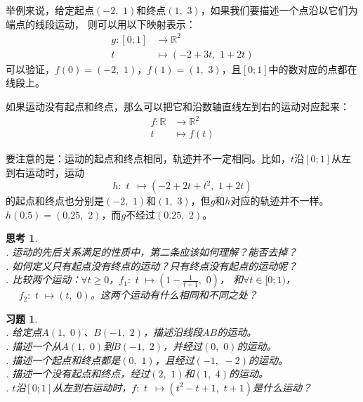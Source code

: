 \documentclass[12pt,UTF8]{ctexbook}
\theoremstyle{definition}
\theoremstyle{plain}
\newtheorem{sk}{思考}[section]
\newtheorem{xt}{习题}[section]
\begin{document}
举例来说，给定起点$(-2,\,\,1)$和终点$(1,\,\,3)$，如果我们要描述一个点沿以它们为端点的线段运动，
则可以用以下映射表示：
\begin{align*}
    g: [0;1] &\rightarrow \mathbb{R}^2  \\
         t \,\,\, &\mapsto (-2 + 3t,\,\, 1 + 2t) 
\end{align*}
可以验证，$f(0) = (-2,\,\,1)$，$f(1) = (1,\,\,3)$，且$[0;1]$中的数对应的点都在线段上。

如果运动没有起点和终点，那么可以把它和沿数轴直线左到右的运动对应起来：
\begin{align*}
    f: \mathbb{R} &\rightarrow \mathbb{R}^2  \\
         t \, &\mapsto f(t) 
\end{align*}

要注意的是：运动的起点和终点相同，轨迹并不一定相同。比如，$t$沿$[0;1]$从左到右运动时，运动
$$ h: \,\, t \,\,\, \mapsto (-2 + 2t + t^2,\,\, 1 + 2t) $$
的起点和终点也分别是$(-2,\,\,1)$和$(1,\,\,3)$，但$g$和$h$对应的轨迹并不一样。
$h(0.5) = (0.25, \,\,2)$，而$g$不经过$(0.25, \,\,2)$。

\begin{sk}
    \mbox{} \\
    . 运动的先后关系满足的性质中，第二条应该如何理解？能否去掉？\\
    . 如何定义只有起点没有终点的运动？只有终点没有起点的运动呢？\\
    . 比较两个运动：$\forall t \geqslant 0$，$f_1:\,\, t \,\, \mapsto (1 - \frac{1}{t+1}, \,\, 0)$，
    和$\forall t \in [0; 1)$，\\
    \indent $\quad \,\, f_2:\,\, t \,\, \mapsto (t, \,\,0)$。这两个运动有什么相同和不同之处？
\end{sk}

\begin{xt}
    \mbox{} \\
    . 给定点$A(1,\,\,0)$、$B(-1,\,\,2)$，描述沿线段$AB$的运动。\\
    . 描述一个从$A(1,\,\,0)$到$B(-1,\,\,2)$，并经过$(0,\,\,0)$的运动。\\
    . 描述一个起点和终点都是$(0, \,\, 1)$，且经过$(-1,\,\, -2)$的运动。\\
    . 描述一个没有起点和终点，经过$(2,\,\, 1)$和$(1,\,\, 4)$的运动。\\
    . $t$沿$[0;1]$从左到右运动时，$f: \,\, t \,\,\, \mapsto (t^2 - t + 1, \,\, t + 1)$是什么运动？
\end{xt}
\end{document}
